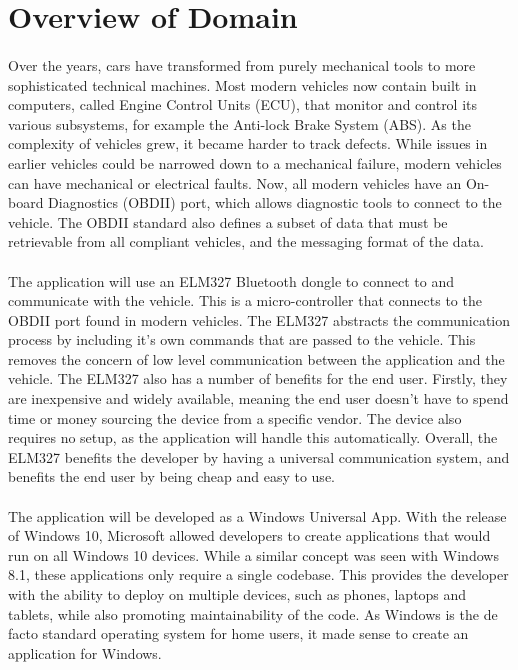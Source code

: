 \section{Overview of Domain}
	\paragraph{}{
	Over the years, cars have transformed from purely mechanical tools to more sophisticated technical machines. Most modern vehicles now contain built in computers, called Engine Control Units (ECU), that monitor and control its various subsystems, for example the Anti-lock Brake System (ABS). As the complexity of vehicles grew, it became harder to track defects. While issues in earlier vehicles could be narrowed down to a mechanical failure, modern vehicles can have mechanical or electrical faults. Now, all modern vehicles have an On-board Diagnostics (OBDII) port, which allows diagnostic tools to connect to the vehicle. The OBDII standard also defines a subset of data that must be retrievable from all compliant vehicles, and the messaging format of the data.		 
	}
	\paragraph{}{
	The application will use an ELM327 Bluetooth dongle to connect to and communicate with the vehicle. This is a micro-controller that connects to the OBDII port found in modern vehicles. The ELM327 abstracts the communication process by including it's own commands that are passed to the vehicle. This removes the concern of low level communication between the application and the vehicle.	The ELM327 also has a number of benefits for the end user. Firstly, they are inexpensive and widely available, meaning the end user doesn't have to spend time or money sourcing the device from a specific vendor. The device also requires no setup, as the application will handle this automatically. Overall, the ELM327 benefits the developer by having a universal communication system, and benefits the end user by being cheap and easy to use.
	}
	\paragraph{}{
	The application will be developed as a Windows Universal App. With the release of Windows 10, Microsoft allowed developers to create applications that would run on all Windows 10 devices. While a similar concept was seen with Windows 8.1, these applications only require a single codebase. This provides the developer with the ability to deploy on multiple devices, such as phones, laptops and tablets, while also promoting maintainability of the code. As Windows is the de facto standard operating system for home users, it made sense to create an application for Windows.
	}
